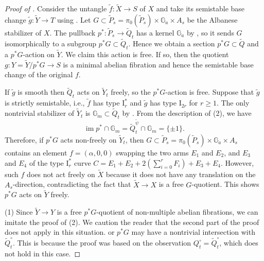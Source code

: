 \documentclass[reqno, letterpaper]{amsart}
\numberwithin{equation}{subsection}
\let\to\longrightarrow
\newcommand{\GG}{\mathbb{G}}
\DeclareMathOperator{\im}{im}
\begin{document}
			\begin{proof} [Proof of ]
				Consider the untangle $\tilde f : \tilde X \to S$ of $X$ and take its semistable base change $\tilde g : \tilde Y \to T$ using . Let $G \subset \tilde P_s = \pi_0(\tilde P_s) \times \GG_a \times A_s$ be the Albanese stabilizer of $X$. The pullback $p^* : \tilde P_s \to \tilde Q_t$ has a kernel $\GG_a$ by , so it sends $G$ isomorphically to a subgroup $p^*G \subset \tilde Q_t$. Hence we obtain a section $p^*G \subset \tilde Q$ and a $p^*G$-action on $\tilde Y$. We claim this action is free. If so, then the quotient $g : Y = \tilde Y/p^*G \to S$ is a minimal abelian fibration and hence the semistable base change of the original $f$.
				
				If $\tilde g$ is smooth then $\tilde Q_t$ acts on $\tilde Y_t$ freely, so the $p^*G$-action is free. Suppose that $\tilde g$ is strictly semistable, i.e., $\tilde f$ has type $\mathrm I_r^*$ and $\tilde g$ has type $\mathrm I_{2r}$ for $r \ge 1$. The only nontrivial stabilizer of $\tilde Y_t$ is $\GG_m \subset \tilde Q_t$ by . From the description of (2), we have
				\[ \im p^* \cap \GG_m = \tilde Q_t^{\tilde \psi} \cap \GG_m = \{ \pm 1 \} .\]
				Therefore, if $p^*G$ acts non-freely on $\tilde Y_t$, then $G \subset \tilde P_s = \pi_0(\tilde P_s) \times \GG_a \times A_s$ contains an element $f = (\alpha, 0, 0)$ swapping the two arms $E_1$ and $E_2$, and $E_3$ and $E_4$ of the type $\mathrm I_r^*$ curve $C = E_1 + E_2 + 2(\sum_{i=0}^r F_i) + E_3 + E_4$. However, such $f$ does not act freely on $\tilde X$ because it does not have any translation on the $A_s$-direction, contradicting the fact that $\tilde X \to X$ is a free $G$-quotient. This shows $p^*G$ acts on $\tilde Y$ freely.
				
				\medskip
				
				(1) Since $\tilde Y \to Y$ is a free $p^*G$-quotient of non-multiple abelian fibrations, we can imitate the proof of (2). We caution the reader that the second part of the proof does not apply in this situation. or $p^*G$ may have a nontrivial intersection with $\tilde Q_t^\circ$. This is because the proof was based on the observation $Q_t^\circ = \tilde Q_t^\circ$, which does not hold in this case.
				
				\medskip
				

\end{proof}
\end{document}
